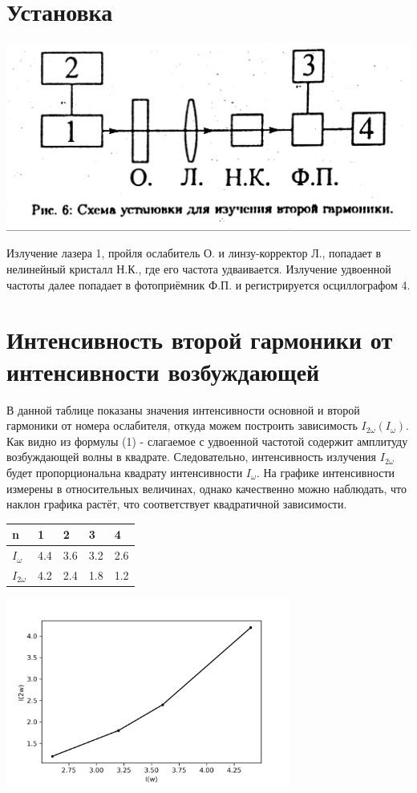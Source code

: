 \documentclass[a4paper,10pt]{article} %
\begin{document}
\section{Установка}
\begin{center}
\includegraphics[width = 0.5 \textwidth]{images/setup.jpg}
\end{center}
Излучение лазера 1, пройля ослабитель О. и линзу-корректор Л., попадает в нелинейный кристалл Н.К., где его частота удваивается. Излучение удвоенной частоты далее попадает в фотоприёмник Ф.П. и регистрируется осциллографом 4.

\section{Интенсивность второй гармоники от интенсивности возбуждающей}
В данной таблице показаны значения интенсивности основной и второй гармоники от номера ослабителя, откуда можем построить зависимость $I_{2 \omega} (I_{\omega})$.\\
Как видно из формулы (1) - слагаемое с удвоенной частотой содержит амплитуду возбуждающей волны в квадрате. Следовательно, интенсивность излучения $I_{2 \omega}$ будет пропорциональна квадрату интенсивности $I_{\omega}$.
На графике интенсивности измерены в относительных величинах, однако качественно можно наблюдать, что наклон графика растёт, что соответствует квадратичной зависимости.

\begin{table}[H]
\begin{tabular}{|l|l|l|l|l|}
\hline
n     & 1   & 2   & 3   & 4   \\ \hline
$I_{\omega}$  & 4.4 & 3.6 & 3.2 & 2.6 \\ \hline
$I_{2 \omega}$ & 4.2 & 2.4 & 1.8 & 1.2 \\ \hline
\end{tabular}
\end{table}

\begin{center}
\includegraphics[width = 0.7\textwidth]{images/plot_1}
\end{center}
\end{document}
